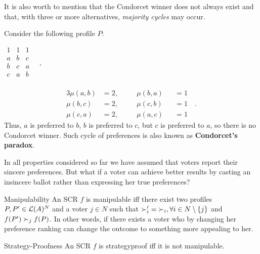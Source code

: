 	It is also worth to mention that the Condorcet winner does not always exist and that, with three or more alternatives, \textit{majority cycles} may occur.
	\begin{example}
		\label{ex:condorcetParadox}
		Consider the following profile $P$:
		\begin{center}
			$
			\begin{array}{ccc}
				1 & 1 & 1 \\
				a &	b & c \\
				b &	c & a \\
				c &	a & b \\
			\end{array} \quad, 
			$
		\end{center}
		\begin{alignat*}{3}
			\mu(a,b)&=2, \quad && \mu(b,a)&&=1  \\ 
			\mu(b,c)&=2, &&\mu(c,b)&&=1  \quad.\\
			\mu(c,a)&=2, &&\mu(a,c)&&=1  
		\end{alignat*}
		Thus, $a$ is preferred to $b$, $b$ is preferred to $c$, but $c$ is preferred to $a$, so there is no Condorcet winner. Such cycle of preferences is also known as \textbf{Condorcet’s paradox}.
	\end{example}

	In all properties considered so far we have assumed that voters report their sincere preferences. But what if a voter can achieve better results by casting an insincere ballot rather than expressing her true preferences?

	\begin{genthm}{Manipulability}
	An \acs{SCR} $f$ is manipulable iff there exist two profiles $P, P' \in\mathcal{L}(A)^{N}$ and a voter $j \in N$ such that $\mathop{\pref'_i}=\mathop{\prefi}, \forall i \in {N \setminus\{j\}}$ and $f(P') \succ_j f(P)$.
	In other words, if there exists a voter who by changing her preference ranking can change the outcome to something more appealing to her.
	\end{genthm}

	\begin{genthm}{Strategy-Proofness}
		An \acs{SCR} $f$ is strategyproof iff it is not manipulable.
	\end{genthm}



